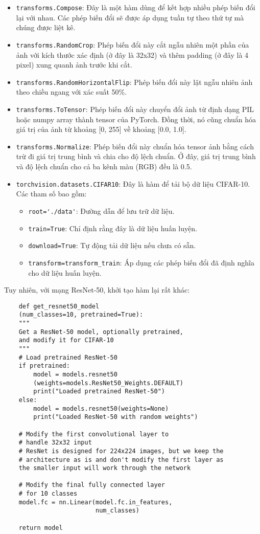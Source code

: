 \documentclass[../main.tex]{subfiles}
\begin{document}
\begin{itemize}
    \item \verb|transforms.Compose|: Đây là một hàm dùng để kết hợp nhiều phép biến đổi lại với nhau. Các phép biến đổi sẽ được áp dụng tuần tự theo thứ tự mà chúng được liệt kê.
    \item \verb|transforms.RandomCrop|: Phép biến đổi này cắt ngẫu nhiên một phần của ảnh với kích thước xác định (ở đây là 32x32) và thêm padding (ở đây là 4 pixel) xung quanh ảnh trước khi cắt.
    \item \verb|transforms.RandomHorizontalFlip|: Phép biến đổi này lật ngẫu nhiên ảnh theo chiều ngang với xác suất 50\%.
    \item \verb|transforms.ToTensor|: Phép biến đổi này chuyển đổi ảnh từ định dạng PIL hoặc numpy array thành tensor của PyTorch. Đồng thời, nó cũng chuẩn hóa giá trị của ảnh từ khoảng [0, 255] về khoảng [0.0, 1.0].
    \item \verb|transforms.Normalize|: Phép biến đổi này chuẩn hóa tensor ảnh bằng cách trừ đi giá trị trung bình và chia cho độ lệch chuẩn. Ở đây, giá trị trung bình và độ lệch chuẩn cho cả ba kênh màu (RGB) đều là 0.5.
    \item \verb|torchvision.datasets.CIFAR10|: Đây là hàm để tải bộ dữ liệu CIFAR-10. Các tham số bao gồm:
    \begin{itemize}
        \item \verb|root='./data'|: Đường dẫn để lưu trữ dữ liệu.
        \item \verb|train=True|: Chỉ định rằng đây là dữ liệu huấn luyện.
        \item \verb|download=True|: Tự động tải dữ liệu nếu chưa có sẵn.
        \item \verb|transform=transform_train|: Áp dụng các phép biến đổi đã định nghĩa cho dữ liệu huấn luyện.
    \end{itemize}
\end{itemize}

Tuy nhiên, với mạng ResNet-50, khởi tạo hàm lại rất khác:

\begin{verbatim}
    def get_resnet50_model
    (num_classes=10, pretrained=True):
    """
    Get a ResNet-50 model, optionally pretrained, 
    and modify it for CIFAR-10
    """
    # Load pretrained ResNet-50
    if pretrained:
        model = models.resnet50
        (weights=models.ResNet50_Weights.DEFAULT)
        print("Loaded pretrained ResNet-50")
    else:
        model = models.resnet50(weights=None)
        print("Loaded ResNet-50 with random weights")
    
    # Modify the first convolutional layer to 
    # handle 32x32 input
    # ResNet is designed for 224x224 images, but we keep the 
    # architecture as is and don't modify the first layer as 
    the smaller input will work through the network
    
    # Modify the final fully connected layer 
    # for 10 classes
    model.fc = nn.Linear(model.fc.in_features, 
                         num_classes)
    
    return model
\end{verbatim}
\end{document}
